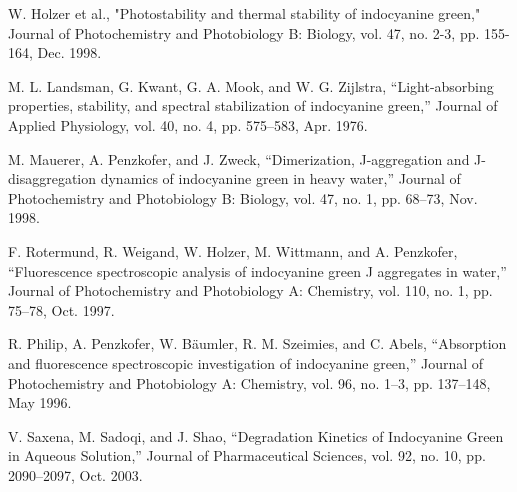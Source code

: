 \begin{thebibliography}{icg}
	W. Holzer et al., "Photostability and thermal stability of indocyanine green," Journal of Photochemistry and Photobiology B: Biology,  vol. 47, no. 2-3, pp. 155-164, Dec. 1998.
	
	M. L. Landsman, G. Kwant, G. A. Mook, and W. G. Zijlstra, “Light-absorbing properties, stability, and spectral stabilization of indocyanine green,” Journal of Applied Physiology, vol. 40, no. 4, pp. 575–583, Apr. 1976.
	
	M. Mauerer, A. Penzkofer, and J. Zweck, “Dimerization, J-aggregation and J-disaggregation dynamics of indocyanine green in heavy water,” Journal of Photochemistry and Photobiology B: Biology, vol. 47, no. 1, pp. 68–73, Nov. 1998.
	
	F. Rotermund, R. Weigand, W. Holzer, M. Wittmann, and A. Penzkofer, “Fluorescence spectroscopic analysis of indocyanine green J aggregates in water,” Journal of Photochemistry and Photobiology A: Chemistry, vol. 110, no. 1, pp. 75–78, Oct. 1997.
	
	R. Philip, A. Penzkofer, W. Bäumler, R. M. Szeimies, and C. Abels, “Absorption and fluorescence spectroscopic investigation of indocyanine green,” Journal of Photochemistry and Photobiology A: Chemistry, vol. 96, no. 1–3, pp. 137–148, May 1996.
	
	V. Saxena, M. Sadoqi, and J. Shao, “Degradation Kinetics of Indocyanine Green in Aqueous Solution,” Journal of Pharmaceutical Sciences, vol. 92, no. 10, pp. 2090–2097, Oct. 2003. 
\end{thebibliography}
